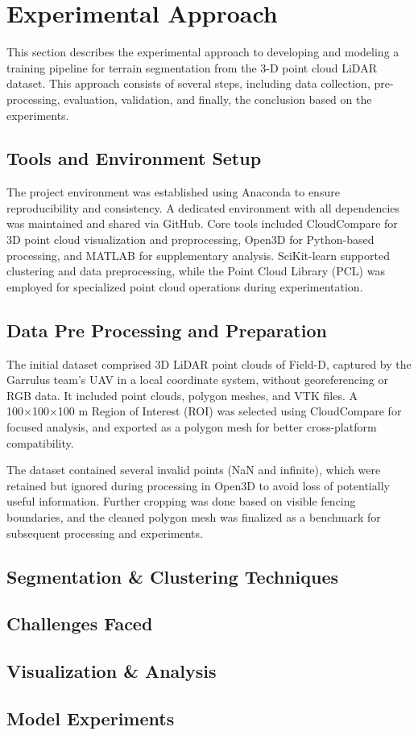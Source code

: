 \documentclass[../report.tex]{subfiles}
\begin{document}
    \section{Experimental Approach}
    This section describes the experimental approach to developing and modeling a training pipeline for terrain segmentation from the 3-D point cloud LiDAR dataset. This approach consists of several steps, including data collection, pre-processing, evaluation, validation, and finally, the conclusion based on the experiments.
    
    \subsection{Tools and Environment Setup}
    The project environment was established using Anaconda to ensure reproducibility and consistency. A dedicated environment with all dependencies was maintained and shared via GitHub. Core tools included CloudCompare for 3D point cloud visualization and preprocessing, Open3D for Python-based processing, and MATLAB for supplementary analysis. SciKit-learn supported clustering and data preprocessing, while the Point Cloud Library (PCL) was employed for specialized point cloud operations during experimentation.

    \subsection{Data Pre Processing and Preparation}
    The initial dataset comprised 3D LiDAR point clouds of Field-D, captured by the Garrulus team’s UAV in a local coordinate system, without georeferencing or RGB data. It included point clouds, polygon meshes, and VTK files. A 100×100×100 m Region of Interest (ROI) was selected using CloudCompare for focused analysis, and exported as a polygon mesh for better cross-platform compatibility.

    The dataset contained several invalid points (NaN and infinite), which were retained but ignored during processing in Open3D to avoid loss of potentially useful information. Further cropping was done based on visible fencing boundaries, and the cleaned polygon mesh was finalized as a benchmark for subsequent processing and experiments.
    
    \subsection{Segmentation & Clustering Techniques}
    
	\subsection{Challenges Faced}
	\subsection{Visualization & Analysis}
	\subsection{Model Experiments}
    
\end{document}
